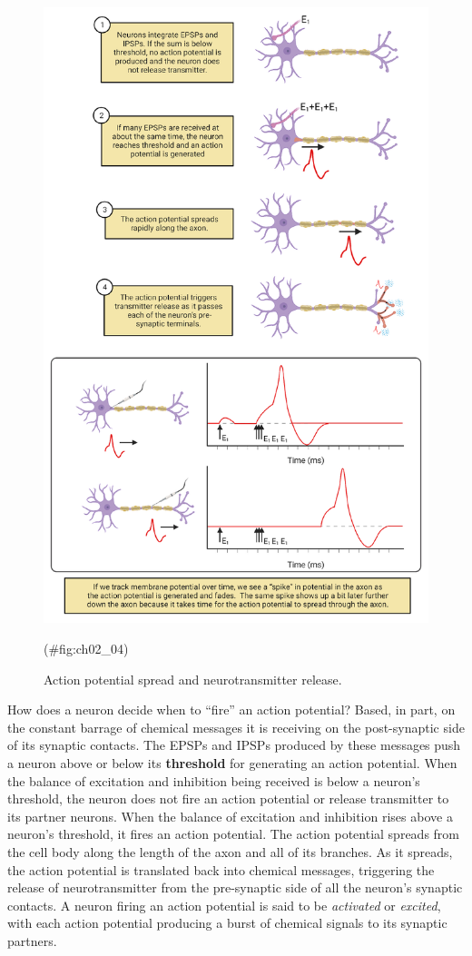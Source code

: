 \documentclass[
]{book}
\begin{document}
\begin{figure}

{\centering \includegraphics[width=0.8\linewidth]{images/ch02/02_04} 

}

\caption{Action potential spread and neurotransmitter release.}(\#fig:ch02_04)
\end{figure}

How does a neuron decide when to ``fire'' an action potential? Based, in part, on the constant barrage of chemical messages it is receiving on the post-synaptic side of its synaptic contacts. The EPSPs and IPSPs produced by these messages push a neuron above or below its \textbf{threshold} for generating an action potential. When the balance of excitation and inhibition being received is below a neuron's threshold, the neuron does not fire an action potential or release transmitter to its partner neurons. When the balance of excitation and inhibition rises above a neuron's threshold, it fires an action potential. The action potential spreads from the cell body along the length of the axon and all of its branches. As it spreads, the action potential is translated back into chemical messages, triggering the release of neurotransmitter from the pre-synaptic side of all the neuron's synaptic contacts. A neuron firing an action potential is said to be \emph{activated} or \emph{excited}, with each action potential producing a burst of chemical signals to its synaptic partners.
\end{document}

